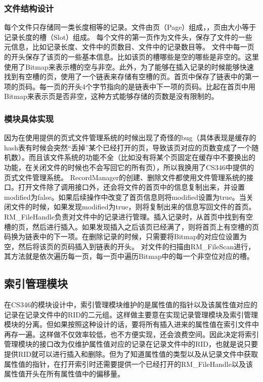 \documentclass[11pt,UTF8]{report}
\begin{document}
\subsubsection{文件结构设计}
每个文件只存储同一类长度相等的记录。文件由页（Page）组成，，页由大小等于记录长度的槽（Slot）组成。
每个文件的第一页作为文件头，保存了文件的一些元信息，比如记录长度、文件中的页数目、文件中的记录数目等。
文件中每一页的开头保存了该页的一些基本信息。比如该页的槽哪些是空的哪些是非空的。这里使用了Bitmap来表示槽的空与非空。此外，为了能够在插入记录的时候能够快速找到有空槽的页，使用了一个链表来存储有空槽的页。首页中保存了链表中的第一项的页码。每一页的开头4个字节指向的是链表中下一项的页码。比起在首页中用Bitmap来表示页是否非空，这种方式能够存储的页数是没有限制的。

\subsubsection{模块具体实现}

因为在使用提供的页式文件管理系统的时候出现了奇怪的bug（具体表现是缓存的hash表有时候会突然“丢掉”某个已经打开的页，导致该页对应的页数变成了一个随机数）。而且该文件系统的功能不全（比如没有将某个页固定在缓存中不要换出的功能，在关闭文件的时候也不会写回它的所有页），所以我换用了CS346中提供的页式文件管理系统。
RecordManager的创建、删除文件都使用文件管理系统的接口。打开文件除了调用接口外，还会将文件的首页中的信息复制出来，并设置modified为false。如果后续操作中改变了首页信息则将modified设置为true。当关闭文件的时候，如果发现modified为true，则将复制出来的信息写回文件的首页。
RM\_FileHandle负责对文件中的记录进行管理。插入记录时，从首页中找到有空槽的页，然后进行插入。如果发现插入之后该页已经满了，则将首页上有空槽的页码换为链表中的下一项。在删除记录的时候，只需要将Bitmap的对应位设置为空，然后将该页的页码插入到链表的开头。
对文件的扫描由RM\_FileScan进行，其方法就是依次遍历每一页，每一页中遍历Bitmap中的每一个非空位对应的槽。

\subsection{索引管理模块}

在CS346的模块设计中，索引管理模块维护的是属性值的指针以及该属性值对应的记录在记录文件中的RID的二元组。这样做主要意在实现记录管理模块及索引管理模块的分离。但如果按照这种设计的话，要将所有插入进来的属性值在索引文件中再存一遍。这样做不仅效率较低，也不方便实现，还会浪费空间。因此决定将索引管理模块的接口改为仅维护属性值对应的记录在记录文件中的RID，也就是说只要提供RID就可以进行插入和删除。但为了知道属性值的类型以及从记录文件中获取属性值的指针，在打开索引时还需要提供一个已经打开的RM\_FileHandle以及该属性值开头在所有属性值中的偏移量。
\end{document}
